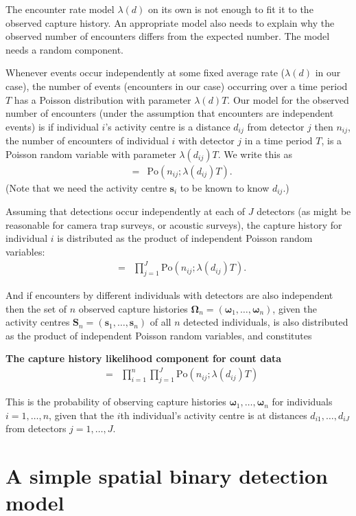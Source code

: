 \documentclass[graybox,envcountchap,sectrefs]{SpringerStyleFiles/styles/svmono}\usepackage[]{graphicx}\usepackage[]{color}
\newcommand{\be}{\begin{eqnarray}}
\newcommand{\ee}{\end{eqnarray}}
\begin{document}
The encounter rate model $\lambda(d)$ on its own is not enough to fit it to the observed capture history. An appropriate model also needs to explain why the observed number of encounters differs from the expected number. The model needs a random component. 

Whenever events occur independently at some fixed average rate ($\lambda(d)$ in our case), the number of events (encounters in our case) occurring over a time period $T$ has a Poisson distribution with parameter $\lambda(d)T$.  Our model for the observed number of encounters (under the assumption that encounters are independent events) is if individual $i$'s activity centre is a distance $d_{ij}$ from detector $j$ then $n_{ij}$, the number of encounters of individual $i$ with detector $j$ in a time period $T$, is a Poisson random variable with parameter $\lambda(d_{ij})T$. We write this as
\be
[n_{ij}|\bm{s}_i]&=&\mbox{Po}\left(n_{ij};\lambda(d_{ij})T\right).
\ee
\noindent
(Note that we need the activity centre $\bm{s}_i$ to be known to know $d_{ij}$.)

Assuming that detections occur independently at each of $J$ detectors (as might be reasonable for camera trap surveys, or acoustic surveys), the capture history for individual $i$ is distributed as the product of independent Poisson random variables:
\be
[\bm{\omega}_i|\bm{s}_i]&=&\prod_{j=1}^J\mbox{Po}\left(n_{ij};\lambda(d_{ij})T\right).
\ee

And if encounters by different individuals with detectors are also independent then the set of $n$ observed capture histories $\bm{\Omega}_n=(\bm{\omega}_1,\ldots,\bm{\omega}_n)$, given the activity centres $\bm{S}_n=(\bm{s}_1,\ldots,\bm{s}_n)$ of all $n$ detected individuals, is also distributed as the product of independent Poisson random variables, and constitutes 
\begin{svgraybox}
\bf{The capture history likelihood component for count data}
\be
[\bm{\Omega}_n|\bm{S}_n]&=&\prod_{i=1}^n\prod_{j=1}^J\mbox{Po}\left(n_{ij};\lambda(d_{ij})T\right)
\label{eq:ER+detfun.P.Omega.count}
\ee
\end{svgraybox}

This is the probability of observing capture histories $\bm{\omega}_1,\ldots,\bm{\omega}_n$ for individuals $i=1,\ldots,n$, given that the $i$th individual's activity centre is at distances $d_{i1},\ldots,d_{iJ}$ from detectors $j=1,\ldots,J$. 

\section{A simple spatial binary detection model}
\label{sec:ER+detfun.simple.det.model}
\end{document}
